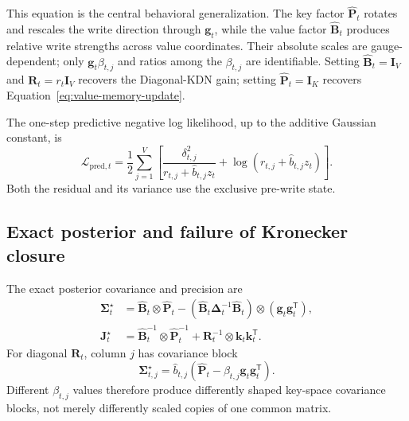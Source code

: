 \documentclass[11pt]{article}
\newcommand{\ve}[1]{\boldsymbol{#1}}
\newcommand{\tr}{\mathsf{T}}
\begin{document}
This equation is the central behavioral generalization.  The key factor
$\widehat{\ve{P}}_t$ rotates and rescales the write direction through $\ve{g}_t$, while the value
factor $\widehat{\ve{B}}_t$ produces relative write strengths across value coordinates.  Their
absolute scales are gauge-dependent; only $\ve{g}_t\beta_{t,j}$ and ratios among the
$\beta_{t,j}$ are identifiable.  Setting
$\widehat{\ve{B}}_t=\ve{I}_V$ and $\ve{R}_t=r_t\ve{I}_V$ recovers the Diagonal-KDN gain;
setting $\widehat{\ve{P}}_t=\ve{I}_K$ recovers
Equation~\eqref{eq:value-memory-update}.

The one-step predictive negative log likelihood, up to the additive Gaussian constant, is
\begin{equation}
  \mathcal{L}_{\mathrm{pred},t}
  =\frac12\sum_{j=1}^{V}
    \left[
      \frac{\delta_{t,j}^2}{r_{t,j}+\widehat b_{t,j}z_t}
      +\log(r_{t,j}+\widehat b_{t,j}z_t)
    \right].
  \label{eq:kdn2-predictive-nll}
\end{equation}
Both the residual and its variance use the exclusive pre-write state.

\subsection{Exact posterior and failure of Kronecker closure}

The exact posterior covariance and precision are
\begin{equation}
\begin{aligned}
  \ve{\Sigma}_t^{\star}
  &={}
    \widehat{\ve{B}}_t\otimes\widehat{\ve{P}}_t
    -(\widehat{\ve{B}}_t\ve{\Delta}_t^{-1}\widehat{\ve{B}}_t)
      \otimes(\ve{g}_t\ve{g}_t^{\tr}),
  \\
  \ve{J}_t^{\star}
  &={}
    \widehat{\ve{B}}_t^{-1}\otimes\widehat{\ve{P}}_t^{-1}
    +\ve{R}_t^{-1}\otimes\ve{k}_t\ve{k}_t^{\tr}.
\end{aligned}
  \label{eq:kdn2-exact-posterior}
\end{equation}
For diagonal $\ve{R}_t$, column $j$ has covariance block
\begin{equation}
  \ve{\Sigma}_{t,j}^{\star}
  =\widehat b_{t,j}
   \left(
     \widehat{\ve{P}}_t
     -\beta_{t,j}\ve{g}_t\ve{g}_t^{\tr}
   \right).
  \label{eq:kdn2-posterior-block}
\end{equation}
Different $\beta_{t,j}$ values therefore produce differently shaped key-space covariance blocks,
not merely differently scaled copies of one common matrix.
\end{document}
